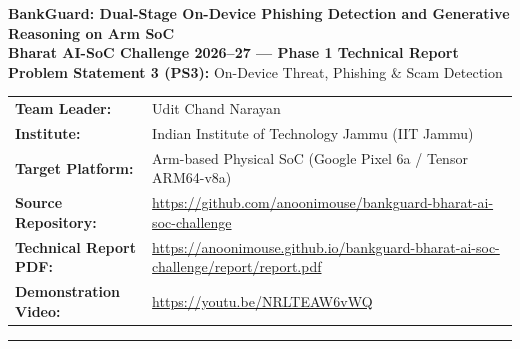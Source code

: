 \documentclass[11pt,a4paper]{article}
\begin{document}
\begin{center}
    {\LARGE \textbf{BankGuard: Dual-Stage On-Device Phishing Detection and Generative Reasoning on Arm SoC}}\\[10pt]
    {\large \textbf{Bharat AI-SoC Challenge 2026--27 --- Phase 1 Technical Report}}\\[4pt]
    {\normalsize \textbf{Problem Statement 3 (PS3):} On-Device Threat, Phishing \& Scam Detection}\\[14pt]
    
    \begin{tabular}{ll}
        \textbf{Team Leader:} & Udit Chand Narayan \\
        \textbf{Institute:} & Indian Institute of Technology Jammu (IIT Jammu) \\
        \textbf{Target Platform:} & Arm-based Physical SoC (Google Pixel 6a / Tensor ARM64-v8a) \\
        \textbf{Source Repository:} & \url{https://github.com/anoonimouse/bankguard-bharat-ai-soc-challenge} \\
        \textbf{Technical Report PDF:} & \url{https://anoonimouse.github.io/bankguard-bharat-ai-soc-challenge/report/report.pdf} \\
        \textbf{Demonstration Video:} & \url{https://youtu.be/NRLTEAW6vWQ} \\
    \end{tabular}
\end{center}

\vspace{10pt}
\hrule
\vspace{15pt}
\end{document}
